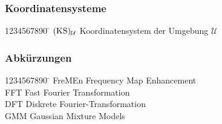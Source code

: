 \subsubsection{Koordinatensysteme}\vspace{-3mm}
\begin{tabbing}
	1234567890 \= \kill
	$({\mathrm{KS}})_{\mathcal{U}}$							        \> Koordinatensystem der Umgebung $\mathcal{U}$ \\
\end{tabbing}
\subsubsection{Abkürzungen}\vspace{-3mm}
\begin{tabbing}
	1234567890 \= \kill
	FreMEn  \> Frequency Map Enhancement \\
	FFT		\> Fast Fourier Transformation \\
	DFT		\> Diskrete Fourier-Transformation \\
	GMM		\> Gaussian Mixture Models \\
\end{tabbing}

